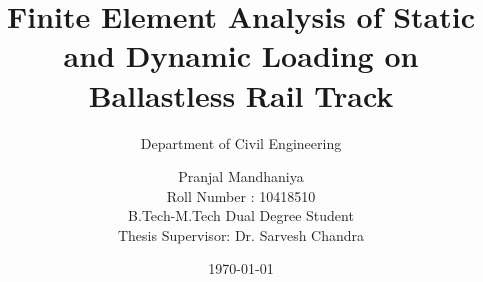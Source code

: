 \documentclass{beamer}
\title{Finite Element Analysis of Static and Dynamic Loading on	Ballastless Rail Track}
\author{Pranjal Mandhaniya\\Roll Number : 10418510 \\B.Tech-M.Tech Dual Degree Student\\Thesis Supervisor: Dr. Sarvesh Chandra}
\subtitle{Department of Civil Engineering }
\institute{Indian Institute of Technology Kanpur}
\date{\today}
\begin{document}
\begin{frame}
\titlepage
\end{frame}






\end{document}

